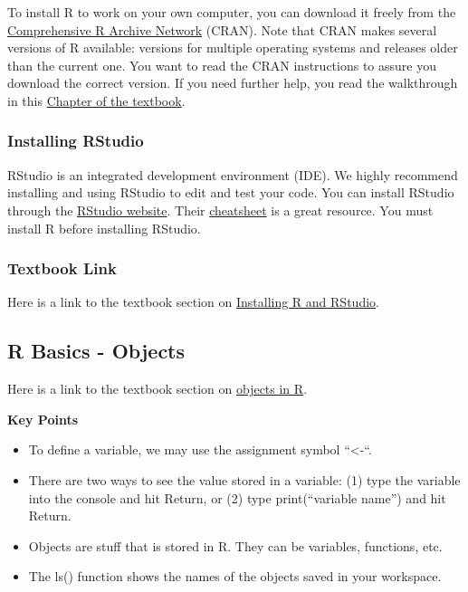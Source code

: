 \documentclass[]{article}
\providecommand{\tightlist}{%
  \setlength{\itemsep}{0pt}\setlength{\parskip}{0pt}}
\begin{document}
To install R to work on your own computer, you can download it freely
from the \href{https://cran.r-project.org}{Comprehensive R Archive
Network} (CRAN). Note that CRAN makes several versions of R available:
versions for multiple operating systems and releases older than the
current one. You want to read the CRAN instructions to assure you
download the correct version. If you need further help, you read the
walkthrough in this
\href{https://rafalab.github.io/dsbook/installing-r-rstudio.html\#installing-r}{Chapter
of the textbook}.

\hypertarget{installing-rstudio}{%
\subsubsection{Installing RStudio}\label{installing-rstudio}}

RStudio is an integrated development environment (IDE). We highly
recommend installing and using RStudio to edit and test your code. You
can install RStudio through the
\href{https://rstudio.com/products/rstudio/download/}{RStudio website}.
Their
\href{https://rstudio.com/wp-content/uploads/2016/01/rstudio-IDE-cheatsheet.pdf}{cheatsheet}
is a great resource. You must install R before installing RStudio.

\hypertarget{textbook-link}{%
\subsubsection{Textbook Link}\label{textbook-link}}

Here is a link to the textbook section on
\href{https://rafalab.github.io/dsbook/installing-r-rstudio.html}{Installing
R and RStudio}.

\hypertarget{r-basics---objects}{%
\subsection{R Basics - Objects}\label{r-basics---objects}}

Here is a link to the textbook section on
\href{https://rafalab.github.io/dsbook/r-basics.html\#objects}{objects
in R}.

\textbf{Key Points}

\begin{itemize}
\tightlist
\item
  To define a variable, we may use the assignment symbol
  ``\textless{}-``.
\item
  There are two ways to see the value stored in a variable: (1) type the
  variable into the console and hit Return, or (2) type print(``variable
  name'') and hit Return.
\item
  Objects are stuff that is stored in R. They can be variables,
  functions, etc.
\item
  The ls() function shows the names of the objects saved in your
  workspace.
\end{itemize}
\end{document}
